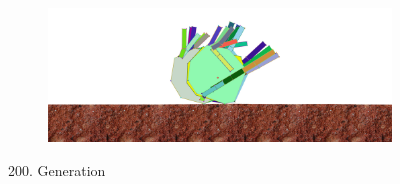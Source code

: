 \begin{figure}[H]
\begin{subfigure}[b]{0.45\textwidth}
              \includegraphics[width=\linewidth,center]{graphics/simulation-results/4_gen200_4}
              \caption{\label{fig:gen200_4}}
            \end{subfigure}
            \caption{200. Generation \label{fig:gen200}}
          \end{figure}

